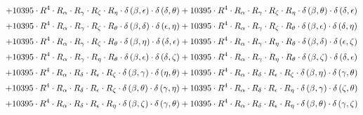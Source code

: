 \begin{subequations}
\begin{gather}
 \\[0.2em] \notag 		 + 10395 \cdot R^{4} \cdot R_{\alpha{}} \cdot R_{\gamma{}} \cdot R_{\zeta{}} \cdot R_{\eta{}} \cdot \delta{}\left(\beta{}, \epsilon{}\right) \cdot \delta{}\left(\delta{}, \theta{}\right)+ 10395 \cdot R^{4} \cdot R_{\alpha{}} \cdot R_{\gamma{}} \cdot R_{\zeta{}} \cdot R_{\eta{}} \cdot \delta{}\left(\beta{}, \theta{}\right) \cdot \delta{}\left(\delta{}, \epsilon{}\right) 
 \\[0.2em] \notag 		 + 10395 \cdot R^{4} \cdot R_{\alpha{}} \cdot R_{\gamma{}} \cdot R_{\zeta{}} \cdot R_{\theta{}} \cdot \delta{}\left(\beta{}, \delta{}\right) \cdot \delta{}\left(\epsilon{}, \eta{}\right)+ 10395 \cdot R^{4} \cdot R_{\alpha{}} \cdot R_{\gamma{}} \cdot R_{\zeta{}} \cdot R_{\theta{}} \cdot \delta{}\left(\beta{}, \epsilon{}\right) \cdot \delta{}\left(\delta{}, \eta{}\right) 
 \\[0.2em] \notag 		 + 10395 \cdot R^{4} \cdot R_{\alpha{}} \cdot R_{\gamma{}} \cdot R_{\zeta{}} \cdot R_{\theta{}} \cdot \delta{}\left(\beta{}, \eta{}\right) \cdot \delta{}\left(\delta{}, \epsilon{}\right)+ 10395 \cdot R^{4} \cdot R_{\alpha{}} \cdot R_{\gamma{}} \cdot R_{\eta{}} \cdot R_{\theta{}} \cdot \delta{}\left(\beta{}, \delta{}\right) \cdot \delta{}\left(\epsilon{}, \zeta{}\right) 
 \\[0.2em] \notag 		 + 10395 \cdot R^{4} \cdot R_{\alpha{}} \cdot R_{\gamma{}} \cdot R_{\eta{}} \cdot R_{\theta{}} \cdot \delta{}\left(\beta{}, \epsilon{}\right) \cdot \delta{}\left(\delta{}, \zeta{}\right)+ 10395 \cdot R^{4} \cdot R_{\alpha{}} \cdot R_{\gamma{}} \cdot R_{\eta{}} \cdot R_{\theta{}} \cdot \delta{}\left(\beta{}, \zeta{}\right) \cdot \delta{}\left(\delta{}, \epsilon{}\right) 
 \\[0.2em] \notag 		 + 10395 \cdot R^{4} \cdot R_{\alpha{}} \cdot R_{\delta{}} \cdot R_{\epsilon{}} \cdot R_{\zeta{}} \cdot \delta{}\left(\beta{}, \gamma{}\right) \cdot \delta{}\left(\eta{}, \theta{}\right)+ 10395 \cdot R^{4} \cdot R_{\alpha{}} \cdot R_{\delta{}} \cdot R_{\epsilon{}} \cdot R_{\zeta{}} \cdot \delta{}\left(\beta{}, \eta{}\right) \cdot \delta{}\left(\gamma{}, \theta{}\right) 
 \\[0.2em] \notag 		 + 10395 \cdot R^{4} \cdot R_{\alpha{}} \cdot R_{\delta{}} \cdot R_{\epsilon{}} \cdot R_{\zeta{}} \cdot \delta{}\left(\beta{}, \theta{}\right) \cdot \delta{}\left(\gamma{}, \eta{}\right)+ 10395 \cdot R^{4} \cdot R_{\alpha{}} \cdot R_{\delta{}} \cdot R_{\epsilon{}} \cdot R_{\eta{}} \cdot \delta{}\left(\beta{}, \gamma{}\right) \cdot \delta{}\left(\zeta{}, \theta{}\right) 
 \\[0.2em] \notag 		 + 10395 \cdot R^{4} \cdot R_{\alpha{}} \cdot R_{\delta{}} \cdot R_{\epsilon{}} \cdot R_{\eta{}} \cdot \delta{}\left(\beta{}, \zeta{}\right) \cdot \delta{}\left(\gamma{}, \theta{}\right)+ 10395 \cdot R^{4} \cdot R_{\alpha{}} \cdot R_{\delta{}} \cdot R_{\epsilon{}} \cdot R_{\eta{}} \cdot \delta{}\left(\beta{}, \theta{}\right) \cdot \delta{}\left(\gamma{}, \zeta{}\right) 

\end{gather}
\end{subequations}
